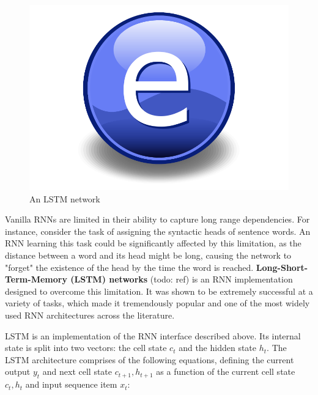 \begin{figure}
    \centering
    \includegraphics{Figures/Electron.pdf}
    \caption{An LSTM network}
    \label{fig:lstm}
\end{figure}

Vanilla RNNs are limited in their ability to capture long range dependencies. For instance, consider the task of assigning the syntactic heads of sentence words. An RNN learning this task could be significantly affected by this limitation, as the distance between a word and its head might be long, causing the network to "forget" the existence of the head by the time the word is reached. \textbf{Long-Short-Term-Memory (LSTM) networks} (todo: ref) is an RNN implementation designed to overcome this limitation. It was shown to be extremely successful at a variety of tasks, which made it tremendously popular and one of the most widely used RNN architectures across the literature.  

LSTM is an implementation of the RNN interface described above. Its internal state is split into two vectors: the cell state $c_t$ and the hidden state $h_t$. The LSTM architecture comprises of the following equations, defining the current output $y_t$ and next cell state $c_{t + 1}, h_{t + 1}$ as a function of the current cell state $c_t, h_t$ and input sequence item $x_t$:

